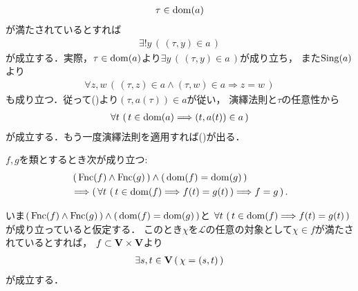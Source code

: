 \begin{prf}
\begin{align}
			\tau \in \operatorname*{dom}(a)
		\end{align}
		が満たされているとすれば
		\begin{align}
			\exists ! y\, (\, (\tau,y) \in a\, )
		\end{align}
		が成立する．実際，$\tau \in \operatorname*{dom}(a)$より$\exists y\, (\, (\tau,y) \in a\, )$が成り立ち，
		また$\operatorname*{Sing}(a)$より
		\begin{align}
			\forall z,w\, (\, (\tau,z) \in a \wedge (\tau,w) \in a \Longrightarrow z=w\, )
		\end{align}
		も成り立つ．従って()より$(\tau,a(\tau)) \in a$が従い，
		演繹法則と$\tau$の任意性から
		\begin{align}
			\forall t\, \left(\, t \in \operatorname*{dom}(a) \Longrightarrow (t,a(t)) \in a\, \right)
		\end{align}
		が成立する．もう一度演繹法則を適用すれば()が出る．
		\QED
	\end{prf}
	
	
	\begin{screen}
		\begin{thm}[定義域と値が一致する写像は等しい]
			$f,g$を類とするとき次が成り立つ:
			\begin{align}
				&\left(\, \operatorname*{Fnc}(f) \wedge \operatorname*{Fnc}(g)\, \right) \wedge 
				\left(\, \operatorname*{dom}(f) = \operatorname*{dom}(g)\, \right) \\
				&\Longrightarrow \left(\, \forall t\, \left(\, t \in \operatorname*{dom}(f) \Longrightarrow f(t) = g(t)\, \right) \Longrightarrow f = g\, \right).
			\end{align}
		\end{thm}
	\end{screen}
	
	\begin{prf}
		いま$\left(\, \operatorname*{Fnc}(f) \wedge \operatorname*{Fnc}(g)\, \right) \wedge \left(\, \operatorname*{dom}(f) = \operatorname*{dom}(g)\, \right)$と
		$\forall t\, \left(\, t \in \operatorname*{dom}(f) \Longrightarrow f(t) = g(t)\, \right)$が成り立っていると仮定する．
		このとき$\chi$を$\mathcal{L}$の任意の対象として$\chi \in f$が満たされているとすれば，
		$f \subset \mathbf{V} \times \mathbf{V}$より
		\begin{align}
			\exists s,t \in \mathbf{V}\, (\, \chi = (s,t)\, )
		\end{align}
		が成立する．
	\end{prf}
	
